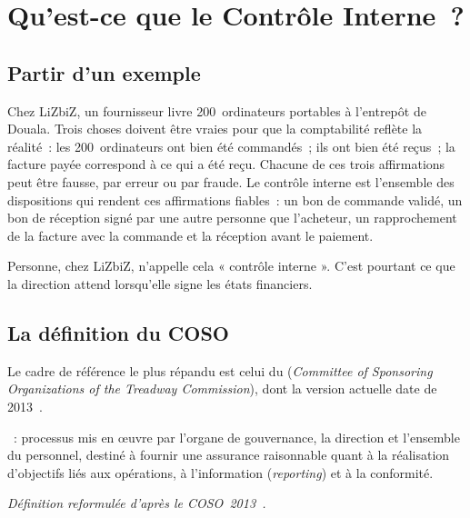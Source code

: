 \section{Qu'est-ce que le Contrôle Interne~?}
\label{sec:c03-definition}

\subsection{Partir d'un exemple}

Chez LiZbiZ, un fournisseur livre 200~ordinateurs portables à l'entrepôt
de Douala. Trois choses doivent être vraies pour que la comptabilité
reflète la réalité~: les 200~ordinateurs ont bien été commandés~; ils ont
bien été reçus~; la facture payée correspond à ce qui a été reçu. Chacune
de ces trois affirmations peut être fausse, par erreur ou par fraude. Le
contrôle interne est l'ensemble des dispositions qui rendent ces
affirmations fiables~: un bon de commande validé, un bon de réception
signé par une autre personne que l'acheteur, un rapprochement de la
facture avec la commande et la réception avant le paiement.

Personne, chez LiZbiZ, n'appelle cela « contrôle interne ». C'est pourtant
ce que la direction attend lorsqu'elle signe les états financiers.

\subsection{La définition du COSO}

Le cadre de référence le plus répandu est celui du 
(\textit{Committee of Sponsoring Organizations of the Treadway Commission}),
dont la version actuelle date de 2013~\cite{coso2013ic}.

\begin{boxdef}
~: processus mis en œuvre
par l'organe de gouvernance, la direction et l'ensemble du personnel, destiné
à fournir une assurance raisonnable quant à la réalisation d'objectifs liés
aux opérations, à l'information (\textit{reporting}) et à la conformité.
\end{boxdef}
{\small\itshape Définition reformulée d'après le COSO~2013~\cite{coso2013ic}.}

\medskip

